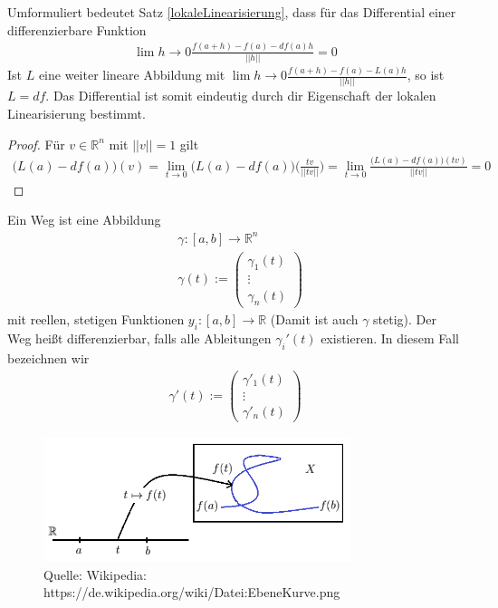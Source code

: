 \begin{Bemerkung}
\label{differentialeindeutig}
Umformuliert bedeutet Satz \ref{lokaleLinearisierung}, dass für das Differential einer differenzierbare Funktion
\begin{align}
\lim{h \to 0} \frac{f(a + h) -f(a) - df(a) h }{||h||} = 0
\end{align}
Ist $L$ eine weiter lineare Abbildung mit $\lim{h \to 0} \frac{f(a + h) -f(a) - L(a) h }{||h||}$, so ist $L = df$. Das Differential ist somit eindeutig durch dir Eigenschaft der lokalen Linearisierung bestimmt.
\end{Bemerkung}
\begin{proof}
Für $v \in \mathbb{R}^n$ mit $||v|| = 1$ gilt 
\begin {align*}
\bigl( L(a) - df(a) \bigr)(v) =  \lim_{t \to 0}  \bigl( L(a) - df(a) \bigr) \bigl( \frac{tv}{||tv||} \bigr) = \lim_{t \to 0} \frac{\bigl( L(a) - df(a) \bigr)(tv) }{||tv||} = 0
\end{align*}
\end{proof}

\begin{Definition}
Ein Weg ist eine Abbildung  
\begin{align*}
& \gamma:  [a,b] \to \mathbb{R}^n \\
& \gamma (t) :=  \begin{pmatrix} \gamma_1(t) \\ \vdots \\ \gamma_n(t) \end{pmatrix}
\end{align*}
mit reellen, stetigen Funktionen $y_i : [a,b] \to \mathbb{R}$ (Damit ist auch $\gamma$ stetig). Der Weg heißt differenzierbar, falls alle Ableitungen $\gamma_i'(t)$ existieren. In diesem Fall bezeichnen wir
\begin{align*}
 \gamma' (t) :=  \begin{pmatrix} \gamma'_1(t) \\ \vdots \\ \gamma'_n(t) \end{pmatrix}
\end{align*}
\end{Definition}

\begin{figure}[H]
      \centering
    \includegraphics[width=0.8\textwidth]{images/EbeneKurve}
      \caption{Quelle: Wikipedia: https://de.wikipedia.org/wiki/Datei:EbeneKurve.png}
\end{figure}

